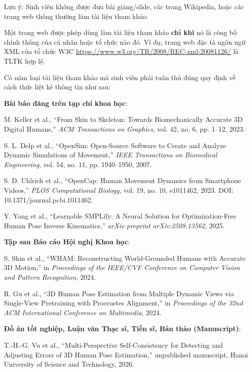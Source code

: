 \documentclass[../DoAn.tex]{subfiles}
\begin{document}
Lưu ý: Sinh viên không được đưa bài giảng/slide, các trang Wikipedia, hoặc các trang web thông thường làm tài liệu tham khảo. 

Một trang web được phép dùng làm tài liệu tham khảo \textbf{chỉ khi} nó là công bố chính thống của cá nhân hoặc tổ chức nào đó. Ví dụ, trang web đặc tả ngôn ngữ XML của tổ chức W3C \url{https://www.w3.org/TR/2008/REC-xml-20081126/} là TLTK hợp lệ.

Có năm loại tài liệu tham khảo mà sinh viên phải tuân thủ đúng quy định về cách thức liệt kê thông tin như sau:

\textbf{Bài báo đăng trên tạp chí khoa học}:

\cite{keller2023skin} M. Keller et al., ``From Skin to Skeleton: Towards Biomechanically Accurate 3D Digital Humans,'' \textit{ACM Transactions on Graphics}, vol. 42, no. 6, pp. 1–12, 2023.

\cite{delp2007opensim} S. L. Delp et al., ``OpenSim: Open-Source Software to Create and Analyze Dynamic Simulations of Movement,'' \textit{IEEE Transactions on Biomedical Engineering}, vol. 54, no. 11, pp. 1940–1950, 2007.

\cite{uhlrich2023opencap} S. D. Uhlrich et al., ``OpenCap: Human Movement Dynamics from Smartphone Videos,'' \textit{PLOS Computational Biology}, vol. 19, no. 10, e1011462, 2023. DOI: 10.1371/journal.pcbi.1011462.

\cite{yang2025learnable} Y. Yang et al., ``Learnable SMPLify: A Neural Solution for Optimization-Free Human Pose Inverse Kinematics,'' \textit{arXiv preprint arXiv:2508.13562}, 2025.

\textbf{Tập san Báo cáo Hội nghị Khoa học}:

\cite{shin2024wham} S. Shin et al., ``WHAM: Reconstructing World-Grounded Humans with Accurate 3D Motion,'' in \textit{Proceedings of the IEEE/CVF Conference on Computer Vision and Pattern Recognition}, 2024.

\cite{gu2024multiview} R. Gu et al., ``3D Human Pose Estimation from Multiple Dynamic Views via Single-View Pretraining with Procrustes Alignment,'' in \textit{Proceedings of the 32nd ACM International Conference on Multimedia}, 2024.

\textbf{Đồ án tốt nghiệp, Luận văn Thạc sĩ, Tiến sĩ, Bản thảo (Manuscript)}:

\cite{vu2026multiperspective} T.-H.-G. Vu et al., ``Multi-Perspective Self-Consistency for Detecting and Adjusting Errors of 3D Human Pose Estimation,'' unpublished manuscript, Hanoi University of Science and Technology, 2026.
\end{document}

